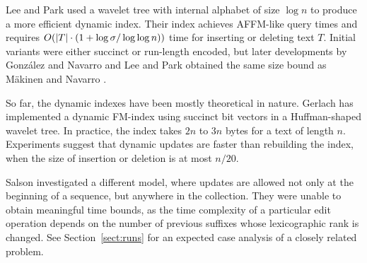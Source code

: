 Lee and Park \cite{Lee2009a} used a wavelet tree with internal alphabet of size $\log n$ to produce a more efficient dynamic index. Their index achieves AFFM-like query times and requires $O(\lvert T \rvert \cdot (1 + \log \sigma / \log \log n))$ time for inserting or deleting text $T$. Initial variants were either succinct or run-length encoded, but later developments by González and Navarro \cite{Gonzalez2009} and Lee and Park \cite{Lee2009} obtained the same size bound as Mäkinen and Navarro \cite{Maekinen2008a}.

So far, the dynamic indexes have been mostly theoretical in nature. Gerlach \cite{Gerlach2007} has implemented a dynamic FM-index using succinct bit vectors in a Huffman-shaped wavelet tree. In practice, the index takes $2n$ to $3n$ bytes for a text of length $n$. Experiments suggest that dynamic updates are faster than rebuilding the index, when the size of insertion or deletion is at most $n / 20$.

Salson  investigated a different model, where updates are allowed not only at the beginning of a sequence, but anywhere in the collection. They were unable to obtain meaningful time bounds, as the time complexity of a particular edit operation depends on the number of previous suffixes whose lexicographic rank is changed. See Section~\ref{sect:runs} for an expected case analysis of a closely related problem.
